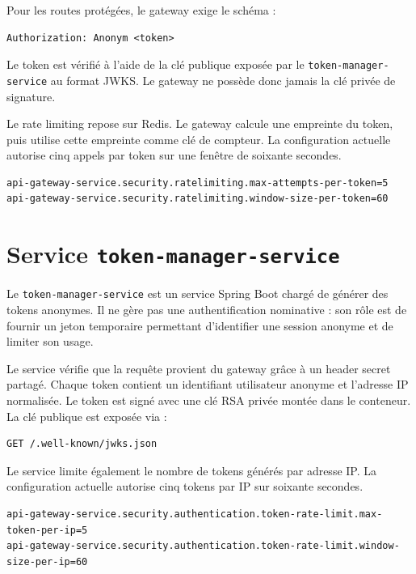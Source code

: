 ﻿\documentclass[12pt, a4paper]{report}
\begin{document}
Pour les routes protégées, le gateway exige le schéma :

\begin{verbatim}
Authorization: Anonym <token>
\end{verbatim}

Le token est vérifié à l'aide de la clé publique exposée par le
\texttt{token-manager-service} au format JWKS. Le gateway ne possède donc jamais
la clé privée de signature.

Le rate limiting repose sur Redis. Le gateway calcule une empreinte du token,
puis utilise cette empreinte comme clé de compteur. La configuration actuelle
autorise cinq appels par token sur une fenêtre de soixante secondes.

\begin{verbatim}
api-gateway-service.security.ratelimiting.max-attempts-per-token=5
api-gateway-service.security.ratelimiting.window-size-per-token=60
\end{verbatim}

\section{Service \texttt{token-manager-service}}

Le \texttt{token-manager-service} est un service Spring Boot chargé de générer
des tokens anonymes. Il ne gère pas une authentification nominative : son rôle
est de fournir un jeton temporaire permettant d'identifier une session anonyme
et de limiter son usage.

Le service vérifie que la requête provient du gateway grâce à un header secret
partagé. Chaque token contient un identifiant utilisateur anonyme et l'adresse IP
normalisée. Le token est signé avec une clé RSA privée montée dans le conteneur.
La clé publique est exposée via :

\begin{verbatim}
GET /.well-known/jwks.json
\end{verbatim}

Le service limite également le nombre de tokens générés par adresse IP. La
configuration actuelle autorise cinq tokens par IP sur soixante secondes.

\begin{verbatim}
api-gateway-service.security.authentication.token-rate-limit.max-token-per-ip=5
api-gateway-service.security.authentication.token-rate-limit.window-size-per-ip=60
\end{verbatim}
\end{document}
